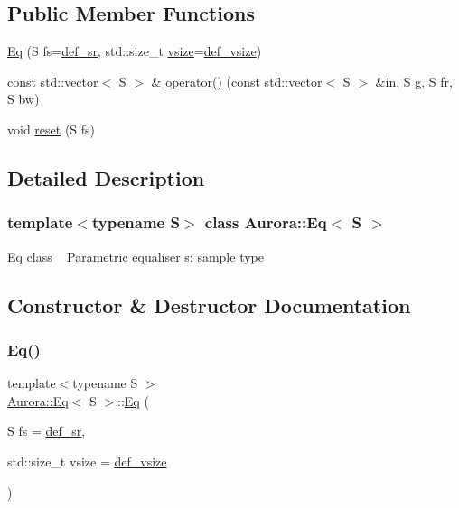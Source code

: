\subsection*{Public Member Functions}
\begin{DoxyCompactItemize}
\item 
\hyperlink{class_aurora_1_1_eq_a97a6037faa2b4d7fe4ce9064e2dd9176}{Eq} (S fs=\hyperlink{namespace_aurora_ad49263d809bea98dd422e95bc91bc03e}{def\+\_\+sr}, std\+::size\+\_\+t \hyperlink{class_aurora_1_1_snd_base_af9e21aaf411b17f7a8221c991ce5d291}{vsize}=\hyperlink{namespace_aurora_afaaddf667a06e7ce23c667a8b7295263}{def\+\_\+vsize})
\item 
const std\+::vector$<$ S $>$ \& \hyperlink{class_aurora_1_1_eq_ac2f97d6c90c4224c9711c00d153c0165}{operator()} (const std\+::vector$<$ S $>$ \&in, S g, S fr, S bw)
\item 
void \hyperlink{class_aurora_1_1_eq_a18e65881b8776c78092c672b9f0ffba3}{reset} (S fs)
\end{DoxyCompactItemize}


\subsection{Detailed Description}
\subsubsection*{template$<$typename S$>$\newline
class Aurora\+::\+Eq$<$ S $>$}

\hyperlink{class_aurora_1_1_eq}{Eq} class ~\newline
Parametric equaliser s\+: sample type 

\subsection{Constructor \& Destructor Documentation}
\mbox{\label{class_aurora_1_1_eq_a97a6037faa2b4d7fe4ce9064e2dd9176}} 
\subsubsection{\texorpdfstring{Eq()}{Eq()}}
{\footnotesize\ttfamily template$<$typename S $>$ \\
\hyperlink{class_aurora_1_1_eq}{Aurora\+::\+Eq}$<$ S $>$\+::\hyperlink{class_aurora_1_1_eq}{Eq} (\begin{DoxyParamCaption}\item[{S}]{fs = {\ttfamily \hyperlink{namespace_aurora_ad49263d809bea98dd422e95bc91bc03e}{def\+\_\+sr}},  }\item[{std\+::size\+\_\+t}]{vsize = {\ttfamily \hyperlink{namespace_aurora_afaaddf667a06e7ce23c667a8b7295263}{def\+\_\+vsize}} }\end{DoxyParamCaption})\hspace{0.3cm}{\ttfamily [inline]}}

